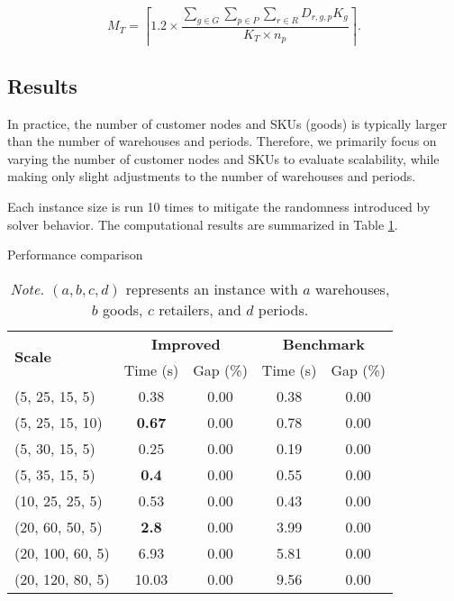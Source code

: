 \documentclass[a4paper,12pt]{article}
\begin{document}
$$
M_T = \left\lceil 1.2 \times \frac{\sum_{g \in G}\sum_{p \in P} \sum_{r \in R} D_{r,g,p}K_g}{K_T \times n_p} \right\rceil.
$$


\subsection{Results}\label{subsec:results}

In practice, the number of customer nodes and SKUs (goods) is typically larger than the number of warehouses and periods.
Therefore, we primarily focus on varying the number of customer nodes and SKUs to evaluate scalability, while making only slight adjustments to the number of warehouses and periods.

Each instance size is run 10 times to mitigate the randomness introduced by solver behavior.
The computational results are summarized in Table \ref{tab:method-comparison}.

\begin{table}[htbp]
    \centering
    \caption{Performance comparison}
    \label{tab:method-comparison}
    \begin{tabular}{lcc|cc}
        \toprule
        \multirow{2}{*}{\textbf{Scale}} & \multicolumn{2}{c|}{\textbf{Improved}} & \multicolumn{2}{c}{\textbf{Benchmark}} \\
        & Time (s) & Gap (\%) & Time (s) & Gap (\%) \\
        \midrule
        (5, 25, 15, 5)   & 0.38 & 0.00 & 0.38  & 0.00  \\
        (5, 25, 15, 10)   & \textbf{0.67} & 0.00 & 0.78  & 0.00  \\
        (5, 30, 15, 5)   & 0.25  & 0.00 & 0.19  & 0.00  \\
        (5, 35, 15, 5)  & \textbf{0.4}  & 0.00 & 0.55  & 0.00 \\
        (10, 25, 25, 5) & 0.53 & 0.00 & 0.43 & 0.00 \\
        (20, 60, 50, 5) & \textbf{2.8} & 0.00 & 3.99 & 0.00 \\
        (20, 100, 60, 5) & 6.93 & 0.00 & 5.81 & 0.00 \\
        (20, 120, 80, 5) & 10.03 & 0.00 & 9.56 & 0.00 \\
        \bottomrule
    \end{tabular}
    \captionsetup{justification=justified,singlelinecheck=false}
    \caption*{\footnotesize \textit{Note.} $(a, b, c, d)$ represents an instance with $a$ warehouses, $b$ goods, $c$ retailers, and $d$ periods.}
\end{table}
\end{document}
